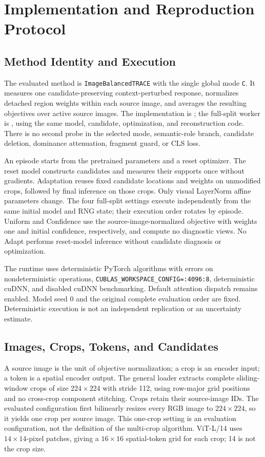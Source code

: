 \section{Implementation and Reproduction Protocol}
\label{app:protocol}
\subsection{Method Identity and Execution}
The evaluated method is \texttt{ImageBalancedTRACE} with the single global mode \texttt{C}. It measures one candidate-preserving context-perturbed response, normalizes detached region weights within each source image, and averages the resulting objectives over active source images. The implementation is ; the full-split worker is , using the same model, candidate, optimization, and reconstruction code. There is no second probe in the selected mode, semantic-role branch, candidate deletion, dominance attenuation, fragment guard, or CLS loss.

An episode starts from the pretrained parameters and a reset optimizer. The reset model constructs candidates and measures their supports once without gradients. Adaptation reuses fixed candidate locations and weights on unmodified crops, followed by final inference on those crops. Only visual LayerNorm affine parameters change. The four full-split settings execute independently from the same initial model and RNG state; their execution order rotates by episode. Uniform and Confidence use the source-image-normalized objective with weights one and initial confidence, respectively, and compute no diagnostic views. No Adapt performs reset-model inference without candidate diagnosis or optimization.

The runtime uses deterministic PyTorch algorithms with errors on nondeterministic operations, \texttt{CUBLAS\_WORKSPACE\_CONFIG=:4096:8}, deterministic cuDNN, and disabled cuDNN benchmarking. Default attention dispatch remains enabled. Model seed 0 and the original complete evaluation order are fixed. Deterministic execution is not an independent replication or an uncertainty estimate.

\subsection{Images, Crops, Tokens, and Candidates}
A source image is the unit of objective normalization; a crop is an encoder input; a token is a spatial encoder output. The general loader extracts complete sliding-window crops of size $224\times224$ with stride 112, using row-major grid positions and no cross-crop component stitching. Crops retain their source-image IDs. The evaluated configuration first bilinearly resizes every RGB image to $224\times224$, so it yields one crop per source image. This one-crop setting is an evaluation configuration, not the definition of the multi-crop algorithm. ViT-L/14 uses $14\times14$-pixel patches, giving a $16\times16$ spatial-token grid for each crop; 14 is not the crop size.

